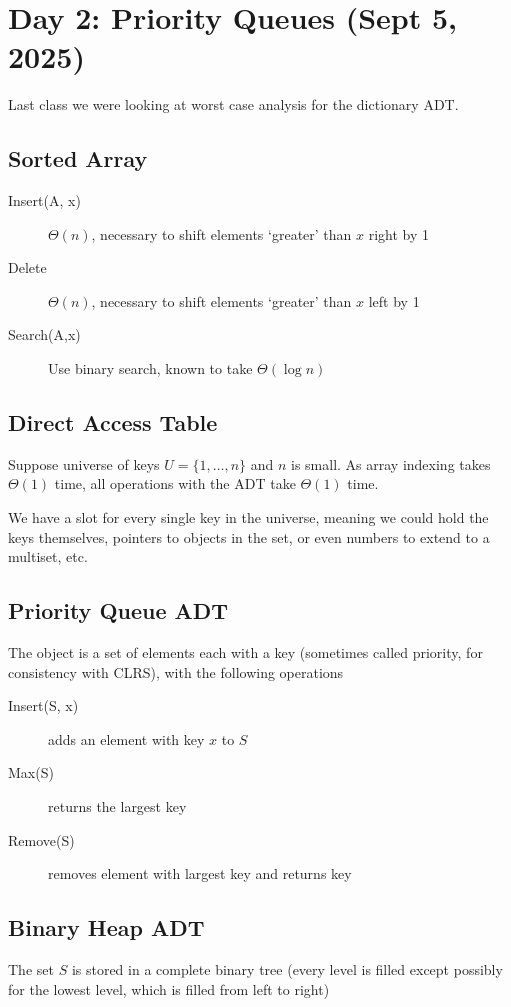 \section{Day 2: Priority Queues (Sept 5, 2025)}

Last class we were looking at worst case analysis for the dictionary ADT.

\subsection*{Sorted Array}
\begin{description}
    \item[Insert(A, x)] $\Theta(n)$, necessary to shift elements `greater' than $x$ right by 1 
    \item[Delete] $\Theta(n)$, necessary to shift elements `greater' than $x$ left by 1 
    \item[Search(A,x)] Use binary search, known to take $\Theta(\log n)$
\end{description}

\subsection*{Direct Access Table}
Suppose universe of keys $U = \{ 1, \dots, n \}$ and $n$ is small. As array indexing takes $\Theta(1)$ time, all operations with the ADT take $\Theta(1)$ time. 

We have a slot for every single key in the universe, meaning we could hold the keys themselves, pointers to objects in the set, or even numbers to extend to a multiset, etc.

\subsection{Priority Queue ADT}
The object is a set of elements each with a key (sometimes called priority, for consistency with CLRS), with the following operations
\begin{description}
    \item[Insert(S, x)] adds an element with key $x$ to $S$ 
    \item[Max(S)] returns the largest key
    \item[Remove(S)] removes element with largest key and returns key
\end{description}

\subsection{Binary Heap ADT}
The set $S$ is stored in a complete binary tree (every level is filled except possibly for the lowest level, which is filled from left to right)

